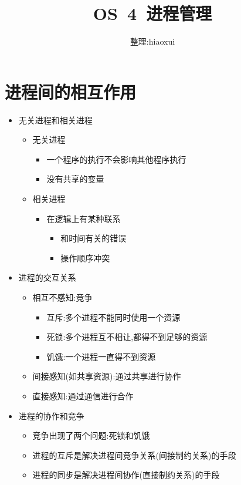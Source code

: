 \documentclass[a4paper,12pt,notitlepage]{article}
\begin{document}
\title{OS\ 4\ 进程管理}
\author{整理:hiaoxui}
\maketitle

\section{进程间的相互作用}

\begin{itemize}
	\item 无关进程和相关进程
	\begin{itemize}
		\item 无关进程
		\begin{itemize}
			\item 一个程序的执行不会影响其他程序执行
			\item 没有共享的变量
		\end{itemize}
		\item 相关进程
		\begin{itemize}
			\item 在逻辑上有某种联系
			\begin{itemize}
				\item 和时间有关的错误
				\item 操作顺序冲突
			\end{itemize}
		\end{itemize}
	\end{itemize}
	\item 进程的交互关系
	\begin{itemize}
		\item 相互不感知:竞争
		\begin{itemize}
			\item 互斥:多个进程不能同时使用一个资源
			\item 死锁:多个进程互不相让,都得不到足够的资源
			\item 饥饿:一个进程一直得不到资源
		\end{itemize}
		\item 间接感知(如共享资源):通过共享进行协作
		\item 直接感知:通过通信进行合作
	\end{itemize}
	\item 进程的协作和竞争
	\begin{itemize}
		\item 竞争出现了两个问题:死锁和饥饿
		\item 进程的互斥是解决进程间竞争关系(间接制约关系)的手段
		\item 进程的同步是解决进程间协作(直接制约关系)的手段

\end{itemize}
\end{itemize}
\end{document}

